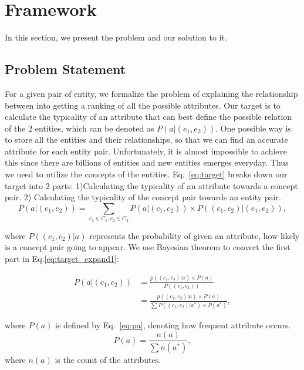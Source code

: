 \section{Framework}


In this section, we present the problem and our solution to it.

\subsection{Problem Statement}

For a given pair of entity, we formalize the problem of explaining the relationship between into getting a ranking of all the possible attributes. Our target is to calculate the typicality of an attribute that can best define the possible relation of the 2 entities, which can be denoted as $P(a| (e_1,e_2) )$. One possible way is to store all the entities and their relationships, so that we can find an accurate attribute for each entity pair. Unfortunately, it is almost impossible to achieve this since there are billions of entities and new entities emerges everyday. Thus we need to utilize the concepts of the entities. Eq.~\ref{eq:target} breaks down our target into 2 parts: 1)Calculating the typicality of an attribute towards a concept pair. 2) Calculating the typicality of the concept pair towards an entity pair.
\begin{equation}
\label{eq:target}
P(a| (e_1,e_2) )= \sum_{c_1\in C_1 ,c_2 \in C_2 }P(a|(c_{1},c_{2}))\times P((c_{1},c_{2})|(e_{1},e_{2})),
\end{equation}

where $P((c_{1},c_{2})|a)$ represents the probability of given an attribute, how likely is a concept pair going to appear. 
We use Bayesian theorem to convert the first part in Eq.\ref{eq:target_expand1}:

\begin{equation}
\label{eq:target_expand1}
\begin{split}
P(a|(c_{1},c_{2})) &= \frac{ p((c_{1},c_{2})|a)\times P(a) }{ P( (c_{1},c_{2}) ) }\\
&=\frac{ p((c_{1},c_{2})|a)\times P(a) }{ \sum{P( (c_{1},c_{2})|a^* )\times P(a^*)   } },
\end{split}
\end{equation}

where $P(a)$ is defined by Eq.~\ref{eq:pa}, denoting how frequent attribute occurs.
\begin{equation}
\label{eq:pa}
P(a)=\frac{n(a)}{\sum{n(a^*)}},
\end{equation}
where $n(a)$ is the count of the attributes.

